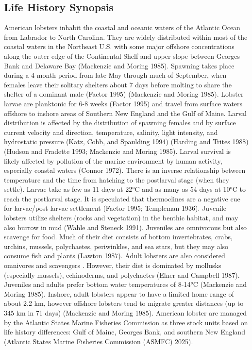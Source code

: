 \documentclass[
  letterpaper,
  DIV=11,
  numbers=noendperiod]{scrartcl}
\begin{document}
\subsection{Life History Synopsis}\label{life-history-synopsis}

American lobsters inhabit the coastal and oceanic waters of the Atlantic
Ocean from Labrador to North Carolina. They are widely distributed
within most of the coastal waters in the Northeast U.S. with some major
offshore concentrations along the outer edge of the Continental Shelf
and upper slope between Georges Bank and Delaware Bay (Mackenzie and
Moring 1985). Spawning takes place during a 4 month period from late May
through much of September, when females leave their solitary shelters
about 7 days before molting to share the shelter of a dominant male
(Factor 1995) (Mackenzie and Moring 1985). Lobster larvae are planktonic
for 6-8 weeks (Factor 1995) and travel from surface waters offshore to
inshore areas of Southern New England and the Gulf of Maine. Larval
distribution is affected by the distribution of spawning females and by
surface current velocity and direction, temperature, salinity, light
intensity, and hydrostatic pressure (Katz, Cobb, and Spaulding 1994)
(Harding and Trites 1988) (Hudson and Fradette 1993; Mackenzie and
Moring 1985). Larval survival is likely affected by pollution of the
marine environment by human activity, especially coastal waters (Connor
1972). There is an inverse relationship between temperature and the time
from hatching to the postlarval stage (when they settle). Larvae take as
few as 11 days at 22°C and as many as 54 days at 10°C to reach the
postlarval stage. It is speculated that thermoclines are a negative cue
for larvae/post larvae settlement (Factor 1995; Templeman 1936).
Juvenile lobsters utilize shelters (rocks and vegetation) in the benthic
habitat, and may also burrow in mud (Wahle and Steneck 1991). Juveniles
are omnivorous but also scavenge for food. Much of their diet consists
of bottom invertebrates, crabs, urchins, mussels, polychaetes,
periwinkles, and sea stars, but they may also consume fish and plants
(Lawton 1987). Adult lobsters are also considered omnivores and
scavengers . However, their diet is dominated by mollusks (especially
mussels), echinoderms, and polychaetes (Elner and Campbell 1987).
Juveniles and adults prefer bottom water temperatures of 8-14°C
(Mackenzie and Moring 1985). Inshore, adult lobsters appear to have a
limited home range of about 2.2 km, however offshore lobsters tend to
migrate greater distances (up to 345 km in 71 days) (Mackenzie and
Moring 1985). American lobster are managed by the Atlantic States Marine
Fisheries Commission as three stock units based on life history
differences: Gulf of Maine, Georges Bank, and southern New England
(Atlantic States Marine Fisheries Commission (ASMFC) 2025).
\end{document}
